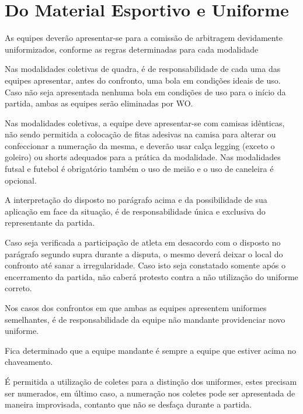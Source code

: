 {\let\clearpage\relax \chapter{Do Material Esportivo e Uniforme %
\label{chp:material}}}


\begin{article}
	As equipes deverão apresentar-se para a comissão de arbitragem devidamente uniformizados, conforme as regras determinadas para cada modalidade

	\begin{xparagraph}
		Nas modalidades coletivas de quadra, é de responsabilidade de cada uma das equipes apresentar, antes do confronto, uma bola em condições ideais de uso. Caso não seja apresentada nenhuma bola em condições de uso para o início da partida, ambas as equipes serão eliminadas por WO.
	\end{xparagraph}

	\begin{xparagraph}
		Nas modalidades coletivas, a equipe deve apresentar-se com camisas idênticas, não sendo permitida a colocação de fitas adesivas na camisa para alterar ou confeccionar a numeração da mesma, e deverão usar calça legging (exceto o goleiro) ou shorts adequados para a prática da modalidade. Nas modalidades futsal e futebol é obrigatório também o uso de meião e o uso de caneleira é opcional.
	\end{xparagraph}

	\begin{xparagraph}
		A interpretação do disposto no parágrafo acima e da possibilidade de sua aplicação em face da situação, é de responsabilidade única e exclusiva do representante da partida.
	\end{xparagraph}

	\begin{xparagraph}
		Caso seja verificada a participação de atleta em desacordo com o disposto no parágrafo segundo supra durante a disputa, o mesmo deverá deixar o local do confronto até sanar a irregularidade. Caso isto seja constatado somente após o encerramento da partida, não caberá protesto contra a não utilização do uniforme correto.
	\end{xparagraph}

	\begin{xparagraph}
		Nos casos dos confrontos em que ambas as equipes apresentem uniformes semelhantes, é de responsabilidade da equipe não mandante providenciar novo uniforme.
	\end{xparagraph}

	\begin{xparagraph}
		Fica determinado que a equipe mandante é sempre a equipe que estiver acima no chaveamento.
	\end{xparagraph}

	\begin{xparagraph}
		É permitida a utilização de coletes para a distinção dos uniformes, estes precisam ser numerados, em último caso, a numeração nos coletes pode ser apresentada de maneira improvisada, contanto que não se desfaça durante a partida.
	\end{xparagraph}
\end{article}
